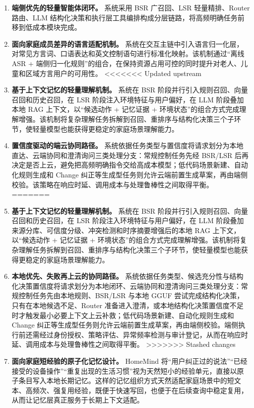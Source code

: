 \documentclass[12pt,a4paper,oneside]{ctexrep}
\begin{document}
\begin{enumerate}
    \item \textbf{端侧优先的轻量智能体闭环。} 系统采用 BSR 广召回、LSR 轻量精排、Router 路由、LLM 结构化决策和执行层工具编排构成分层链路，将高频明确任务前移到低成本模块完成。
    \item \textbf{面向家庭成员差异的语言适配机制。} 系统在交互主链中引入语言归一化层，对常见方言词、口语表达和英文控制语句进行标准化映射。该机制通过“离线 ASR + 端侧归一化规则”的组合，在保持资源占用可控的同时提升对老人、儿童和区域方言用户的可用性。
<<<<<<< Updated upstream
    \item \textbf{基于上下文记忆的轻量理解机制。} 系统在 BSR 阶段并行引入规则召回、向量召回和历史召回，在 LSR 阶段注入环境特征与用户偏好，在 LLM 阶段叠加本地 RAG 上下文，以“候选动作 + 记忆证据 + 环境状态”的组合方式完成理解增强。该机制将复杂理解任务拆解到召回、重排序与结构化决策三个子环节，使轻量模型也能获得更稳定的家庭场景理解能力。
    \item \textbf{置信度驱动的端云协同路径。} 系统依据任务类型与置信度将请求划分为本地直达、云端协同和澄清询问三类处理分支：常规控制任务先经 BSR/LSR 后再决定是否上云，避免把高频明确指令交给高成本模型；低代码场景新建、自动化规则生成和 Change 纠正等生成型任务则允许云端前置生成草案，再由端侧校验。该策略在响应时延、调用成本与处理鲁棒性之间取得平衡。
=======
\item \textbf{基于上下文记忆的轻量理解机制。} 系统在 BSR 阶段并行引入规则召回、向量召回和历史召回，在 LSR 阶段注入环境特征与用户偏好，在 LLM 阶段叠加来源分库、可信度分级、冲突检测和时序摘要增强后的本地 RAG 上下文，以“候选动作 + 记忆证据 + 环境状态”的组合方式完成理解增强。该机制将复杂理解任务拆解到召回、重排序与结构化决策三个子环节，使轻量模型也能获得更稳定的家庭场景理解能力。
\item \textbf{本地优先、失败再上云的协同路径。} 系统依据任务类型、候选充分性与结构化决策置信度将请求划分为本地闭环、云端协同和澄清询问三类处理分支：常规控制任务先由本地规则、BSR/LSR 与本地 GGUF 尝试完成结构化决策，只有在本地候选不足、Router 准备进入澄清，或本地结构化决策置信度不足时才触发最小必要上下文上云补救；低代码场景新建、自动化规则生成和 Change 纠正等生成型任务则允许云端前置生成草案，再由端侧校验。端侧执行前还需经过身份授权、策略评估、异常频率检测与审计登记，从而在响应时延、调用成本与处理鲁棒性之间取得平衡。
>>>>>>> Stashed changes
    \item \textbf{面向家庭短经验的原子化记忆设计。} HomeMind 将“用户纠正过的说法”“已经接受的设备操作”“重复出现的生活习惯”视为天然短小的经验单元，直接以原子条目写入本地长期记忆。这样的记忆组织方式天然适配家庭场景中的短文本、高频次、强复用经验，既便于快速写回，也便于在后续查询中稳定复用，从而让记忆层真正服务于长期上下文适配。

\end{enumerate}
\end{document}
